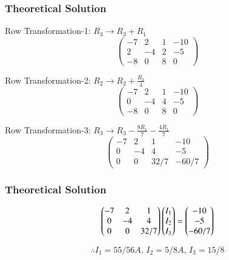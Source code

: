 \documentclass{beamer}
\begin{document}
\begin{frame}[fragile]
    \frametitle{Theoretical Solution}
Row Transformation-1: $R_3 \rightarrow R_3 + R_1$
\begin{equation}
\left(
\begin{array}{ccc|c}
     -7 & 2 & 1 & -10  \\
     2 & -4 & 2 & -5 \\
     -8 & 0 & 8 & 0 
\end{array}
\right)
\end{equation}

Row Transformation-2: $R_2 \rightarrow R_2 + \frac{R_3}{4}$
\begin{equation}
\left(
\begin{array}{ccc|c}
     -7 & 2 & 1 & -10  \\
     0 & -4 & 4 & -5 \\
     -8 & 0 & 8 & 0 
\end{array}
\right)
\end{equation}

Row Transformation-3: $R_3 \rightarrow R_3 - \frac{8R_1}{7} - \frac{4R_1}{7}$
\begin{equation}
\left(
\begin{array}{ccc|c}
     -7 & 2 & 1 & -10  \\
     0 & -4 & 4 & -5 \\
     0 & 0 & 32/7 & -60/7 
\end{array}
\right)
\end{equation}
\end{frame}


\begin{frame}[fragile]
    \frametitle{Theoretical Solution}
 \bigskip

\begin{equation}
    \begin{pmatrix}-7 &  2 & 1 \\ 0 & -4 & 4 \\ 0 & 0 & 32/7 \end{pmatrix}\begin{pmatrix}I_1 \\ I_2 \\ I_3\end{pmatrix} = \begin{pmatrix}-10 \\ -5 \\ -60/7 \end{pmatrix}
\end{equation}

\bigskip

\begin{equation}
\boxed{\therefore I_1 = 55/56 A, \, I_2 = 5/8 A, \, I_3 = 15/8}
\end{equation}
\end{frame}
\end{document}
